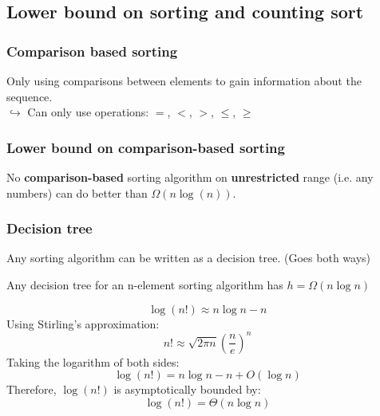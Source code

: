 \subsection{Lower bound on sorting and counting sort}
   
    \subsubsection{Comparison based sorting}
    \begin{definition}
        Only using comparisons between elements to gain information about the sequence. \\
        \hspace{0.5cm} $\hookrightarrow$ Can only use operations: $=$, $<$, $>$, $\leq$, $\geq$    
    \end{definition}
    \subsubsection{Lower bound on comparison-based sorting}
    \begin{definition}
        No \textbf{comparison-based} sorting algorithm on \textbf{unrestricted} range (i.e. any numbers) can do better than $\Omega(n\log(n))$.    
    \end{definition}

    \subsubsection{Decision tree}
    \begin{definition}
        Any sorting algorithm can be written as a decision tree. (Goes both ways)
    \end{definition}

    \begin{example}
    \end{example}

    \begin{theorem}
        Any decision tree for an n-element sorting algorithm has $h=\Omega (n\log n)$
    \end{theorem}

    \begin{derivation}
        \[
        \log(n!) \approx n \log n - n
        \]
        Using Stirling's approximation:
        \[
        n! \approx \sqrt{2\pi n} \left( \frac{n}{e} \right)^n
        \]
        Taking the logarithm of both sides:
        \[
        \log(n!) = n \log n - n + O(\log n)
        \]
        Therefore, \(\log(n!)\) is asymptotically bounded by:
        \[
        \log(n!) = \Theta(n \log n)
        \]
    \end{derivation}

